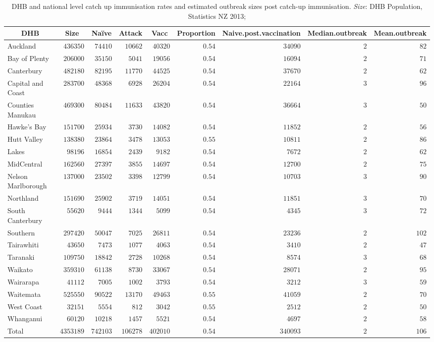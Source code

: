 \documentclass{article}
\begin{document}
\begin{table}\small
\begin{center}
\begin{tabular}{lrrrrrrrr}
\hline\hline
\multicolumn{1}{c}{DHB}&\multicolumn{1}{c}{Size}&\multicolumn{1}{c}{Naïve}&\multicolumn{1}{c}{Attack}&\multicolumn{1}{c}{Vacc}&\multicolumn{1}{c}{Proportion}&\multicolumn{1}{c}{Naive.post.vaccination}&\multicolumn{1}{c}{Median.outbreak}&\multicolumn{1}{c}{Mean.outbreak}\tabularnewline
\hline
Auckland&$ 436350$&$ 74410$&$ 10662$&$ 40320$&$0.54$&$ 34090$&$2$&$ 82$\tabularnewline
Bay of Plenty&$ 206000$&$ 35150$&$  5041$&$ 19056$&$0.54$&$ 16094$&$2$&$ 71$\tabularnewline
Canterbury&$ 482180$&$ 82195$&$ 11770$&$ 44525$&$0.54$&$ 37670$&$2$&$ 62$\tabularnewline
Capital and Coast&$ 283700$&$ 48368$&$  6928$&$ 26204$&$0.54$&$ 22164$&$3$&$ 96$\tabularnewline
Counties Manukau&$ 469300$&$ 80484$&$ 11633$&$ 43820$&$0.54$&$ 36664$&$3$&$ 50$\tabularnewline
Hawke's Bay&$ 151700$&$ 25934$&$  3730$&$ 14082$&$0.54$&$ 11852$&$2$&$ 56$\tabularnewline
Hutt Valley&$ 138380$&$ 23864$&$  3478$&$ 13053$&$0.55$&$ 10811$&$2$&$ 86$\tabularnewline
Lakes&$  98196$&$ 16854$&$  2439$&$  9182$&$0.54$&$  7672$&$2$&$ 62$\tabularnewline
MidCentral&$ 162560$&$ 27397$&$  3855$&$ 14697$&$0.54$&$ 12700$&$2$&$ 75$\tabularnewline
Nelson Marlborough&$ 137000$&$ 23502$&$  3398$&$ 12799$&$0.54$&$ 10703$&$3$&$ 90$\tabularnewline
Northland&$ 151690$&$ 25902$&$  3719$&$ 14051$&$0.54$&$ 11851$&$3$&$ 70$\tabularnewline
South Canterbury&$  55620$&$  9444$&$  1344$&$  5099$&$0.54$&$  4345$&$3$&$ 72$\tabularnewline
Southern&$ 297420$&$ 50047$&$  7025$&$ 26811$&$0.54$&$ 23236$&$2$&$102$\tabularnewline
Tairawhiti&$  43650$&$  7473$&$  1077$&$  4063$&$0.54$&$  3410$&$2$&$ 47$\tabularnewline
Taranaki&$ 109750$&$ 18842$&$  2728$&$ 10268$&$0.54$&$  8574$&$3$&$ 68$\tabularnewline
Waikato&$ 359310$&$ 61138$&$  8730$&$ 33067$&$0.54$&$ 28071$&$2$&$ 95$\tabularnewline
Wairarapa&$  41112$&$  7005$&$  1002$&$  3793$&$0.54$&$  3212$&$3$&$ 59$\tabularnewline
Waitemata&$ 525550$&$ 90522$&$ 13170$&$ 49463$&$0.55$&$ 41059$&$2$&$ 70$\tabularnewline
West Coast&$  32151$&$  5554$&$   812$&$  3042$&$0.55$&$  2512$&$2$&$ 50$\tabularnewline
Whanganui&$  60120$&$ 10218$&$  1457$&$  5521$&$0.54$&$  4697$&$2$&$ 58$\tabularnewline
Total&$4353189$&$742103$&$106278$&$402010$&$0.54$&$340093$&$2$&$106$\tabularnewline
\hline
\end{tabular}\end{center}\caption{DHB and national level catch up immunisation rates and estimated outbreak sizes post catch-up immunisation. \textit{Size}: DHB Population, Statistics NZ 2013;    
}
\end{table}
\end{document}
